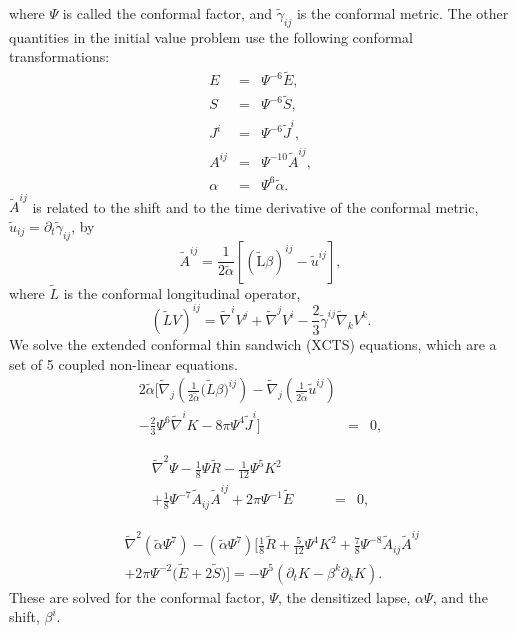 where $\Psi$ is called the conformal factor, and $\tilde{\gamma}_{ij}$
is the conformal metric. The other quantities in the initial value
problem use the following conformal transformations:
\begin{eqnarray}
E &=& \Psi^{-6}\tilde{E}, \\
S &=& \Psi^{-6}\tilde{S}, \\
J^i &=& \Psi^{-6}\tilde{J}^i, \\
A^{ij} &=& \Psi^{-10}\tilde{A}^{ij}, \\
\alpha &=& \Psi^{6}\tilde{\alpha}. 
\end{eqnarray}
$\tilde{A}^{ij}$ is related to the shift and to the time derivative of
the conformal metric, $\tilde{u}_{ij}=\partial_t\tilde{\gamma}_{ij}$,
by
\begin{equation}
\tilde{A}^{ij} =
\frac{1}{2\tilde{\alpha}}\left[\left(\tilde{\mathrm{L}}\beta\right)^{ij}-\tilde{u}^{ij}\right],
\end{equation}
where $\tilde{L}$ is the conformal longitudinal operator,
\begin{equation}
\left(\tilde{L}V\right)^{ij}=\tilde{\nabla}^iV^j + \tilde{\nabla}^jV^i
- \frac{2}{3}\tilde{\gamma}^{ij}\tilde{\nabla}_kV^k.
\end{equation}
We solve the extended conformal thin sandwich (XCTS) equations, which are a set of 5
coupled non-linear equations.
\begin{eqnarray}
2\tilde{\alpha}\bigg[\tilde{\nabla}_j\left(\frac{1}{2\tilde{\alpha}}\big(\tilde{L}\beta\big)^{ij}\right)-\tilde{\nabla}_j\left(\frac{1}{2\tilde{\alpha}}\tilde{u}^{ij}\right) && \nonumber\\
\label{eq:XCTS-Shift}
-\frac{2}{3}\Psi^6\tilde{\nabla}^iK-8\pi\Psi^4\tilde{J}^i\bigg] &=&0,
\end{eqnarray}

\begin{eqnarray}
\tilde{\nabla}^2\Psi - \frac{1}{8}\Psi\tilde{R} -
\frac{1}{12}\Psi^5K^2  \qquad\quad && \nonumber \\
\label{eq:XCTS-ConformalFactor}
+\frac{1}{8}\Psi^{-7}\tilde{A}_{ij}\tilde{A}^{ij} +
2\pi\Psi^{-1}\tilde{E} &=& 0,
\end{eqnarray}

\begin{eqnarray}
&&\tilde{\nabla}^2\left(\tilde{\alpha}\Psi^7\right) -
\left(\tilde{\alpha}\Psi^7\right)\bigg[\frac{1}{8}\tilde{R}+\frac{5}{12}\Psi^4K^2+\frac{7}{8}\Psi^{-8}\tilde{A}_{ij}\tilde{A}^{ij}\nonumber \\
\label{eq:XCTS-Lapse}
&&+2\pi\Psi^{-2}\big(\tilde{E}+2\tilde{S}\big)\bigg]=-\Psi^5\left(\partial_{t}K
- \beta^{k}\partial_kK\right).
\end{eqnarray}
These are solved
for the conformal factor, $\Psi$, the densitized lapse, $\alpha\Psi$,
and the shift, $\beta^i$.

